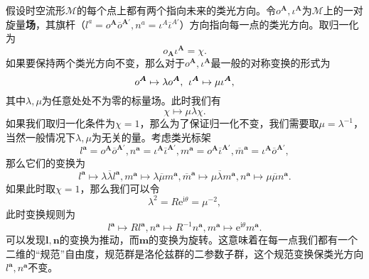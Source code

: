 假设时空流形$\mathcal{M}$的每个点上都有两个指向未来的类光方向。令$o^{\boldsymbol{A}} ,\iota ^{\boldsymbol{A}}$为$\mathcal{M}$上的一对旋量\textbf{场}，其旗杆（$l^{a} =o^{\boldsymbol{A}}\overline{o}^{\boldsymbol{A} '} ,n^{a} =\iota ^{A}\overline{\iota }^{A'}$）方向指向每一点的类光方向。取归一化为
\begin{equation*}
	o_{\boldsymbol{A}} \iota ^{\boldsymbol{A}} =\chi .
\end{equation*}
如果要保持两个类光方向不变，那么对于$o^{\boldsymbol{A}} ,\iota ^{\boldsymbol{A}}$最一般的对称变换的形式为
\begin{equation}
	o^{\boldsymbol{A}} \mapsto \lambda o^{\boldsymbol{A}} ,\kern+0.4em \iota ^{\boldsymbol{A}} \mapsto \mu \iota ^{\boldsymbol{A}} ,
	\label{eq:5.80}
\end{equation}
其中$\lambda ,\mu $为任意处处不为零的标量场。此时我们有
\begin{equation*}
	\chi \mapsto \mu \lambda \chi .
\end{equation*}
如果我们取归一化条件为$\chi =1$，那么为了保证归一化不变，我们需要取$\mu =\lambda ^{-1}$，当然一般情况下$\lambda ,\mu $为无关的量。考虑类光标架
\begin{equation*}
	l^{\boldsymbol{a}} =o^{\boldsymbol{A}}\overline{o}^{\boldsymbol{A} '} ,n^{\boldsymbol{a}} =\iota ^{\boldsymbol{A}}\overline{\iota }^{\boldsymbol{A} '} ,m^{\boldsymbol{a}} =o^{\boldsymbol{A}}\overline{\iota }^{\boldsymbol{A} '} ,\overline{m}^{\boldsymbol{a}} =\iota ^{\boldsymbol{A}}\overline{o}^{\boldsymbol{A} '} ,
\end{equation*}
那么它们的变换为
\begin{equation*}
	l^{\boldsymbol{a}} \mapsto \lambda \overline{\lambda } l^{\boldsymbol{a}} ,m^{\boldsymbol{a}} \mapsto \lambda \overline{\mu } m^{\boldsymbol{a}} ,\overline{m}^{\boldsymbol{a}} \mapsto \mu \overline{\lambda } m^{\boldsymbol{a}} ,n^{\boldsymbol{a}} \mapsto \mu \overline{\mu } n^{\boldsymbol{a}} .
\end{equation*}
如果此时取$\chi =1$，那么我们可以令
\begin{equation*}
	\lambda ^{2} =R\mathrm{e}^{\mathrm{i} \theta } =\mu ^{-2} ,
\end{equation*}
此时变换规则为
\begin{equation*}
	l^{\boldsymbol{a}} \mapsto Rl^{\boldsymbol{a}} ,n^{\boldsymbol{a}} \mapsto R^{-1} n^{\boldsymbol{a}} ,m^{\boldsymbol{a}} \mapsto \mathrm{e}^{\mathrm{i} \theta } m^{\boldsymbol{a}} .
\end{equation*}
可以发现$\boldsymbol{l} ,\boldsymbol{n}$的变换为推动，而$\boldsymbol{m}$的变换为旋转。这意味着在每一点我们都有一个二维的“规范”自由度，规范群是洛伦兹群的二参数子群，这个规范变换保类光方向$l^{\boldsymbol{a}} ,n^{\boldsymbol{a}}$不变。



